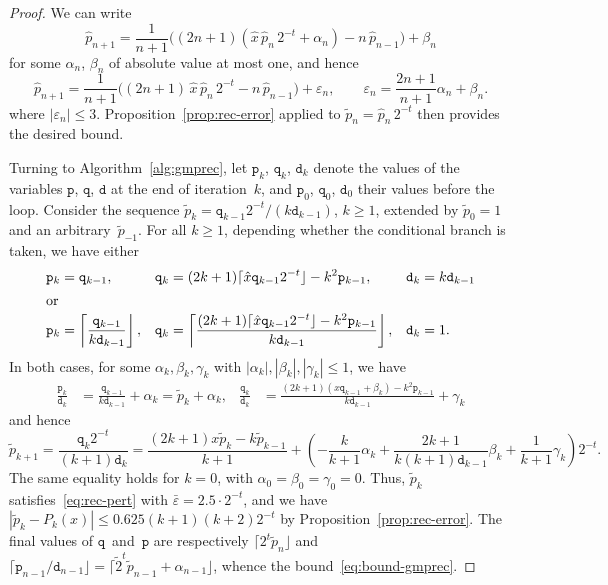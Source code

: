 \documentclass{siamart0216}
\newcommand{\abs}[1]{\mathopen| #1 \mathclose|}
\begin{document}
\begin{proof}
We can write
\[
  \hat{p}_{n + 1} = \frac{1}{n + 1}  \bigl((2 n + 1)  (\hat{x} \,
        \hat{p}_n \, 2^{- t} + \alpha_n) - n \, \hat{p}_{n - 1}\bigr)
        + \beta_n
\]
for some $\alpha_n$, $\beta_n$ of absolute value at most one, and
hence
\[
  \hat{p}_{n + 1} = \frac{1}{n + 1}  \bigl((2 n + 1) \, \hat{x} \,
  \hat{p}_n \, 2^{- t} - n \, \hat{p}_{n - 1}\bigr) + \varepsilon_n,
  \qquad
  \varepsilon_n = \frac{2 n + 1}{n + 1} \alpha_n + \beta_n.
\]
where $\abs{\varepsilon_n} \leq 3$.
Proposition \ref{prop:rec-error} applied to
$\tilde p_n = \hat p_n \, 2^{-t}$
then provides the desired bound.

\newcommand{\vp}{\mathtt p}
\newcommand{\vq}{\mathtt q}
\newcommand{\vd}{\mathtt d}

Turning to Algorithm~\ref{alg:gmprec},
let $\vp_k$, $\vq_k$, $\vd_k$ denote the values of the variables
$\vp$, $\vq$, $\vd$ at the end of iteration~$k$,
and $\vp_0$, $\vq_0$, $\vd_0$ their values before the loop.
Consider the sequence
$\tilde p_k = \vq_{k-1} 2^{-t}/(k \vd_{k-1})$, $k \geq 1$,
extended by $\tilde p_0 = 1$ and an arbitrary~$\tilde p_{-1}$.
For all $k \geq 1$,
depending whether the conditional branch is taken, we have either
\begin{align*}
  \vp_k &= \vq_{k-1}, &
  \vq_k &= (2k+1) \lceil \hat x \vq_{k-1} 2^{-t} \rfloor
          - k^2 \vp_{k-1}, &
  \vd_k &= k \vd_{k-1} \\
\intertext{or}
  \vp_k &= \left\lceil \frac{\vq_{k-1}}{k \vd_{k-1}} \right\rfloor, &
  \vq_k &= \left\lceil \frac{
          (2k+1) \lceil \hat x \vq_{k-1} 2^{-t} \rfloor - k^2 \vp_{k-1}}
          {k \vd_{k-1}} \right\rfloor, &
  \vd_k &= 1.
\end{align*}
In both cases, for some $\alpha_k, \beta_k, \gamma_k$ with
$|\alpha_k|, |\beta_k|, |\gamma_k| \leq 1$, we have
\begin{align*}
  \frac{\vp_k}{\vd_k}
  &= \frac{\vq_{k-1}}{k \vd_{k-1}} + \alpha_k
   = \tilde p_k + \alpha_k, &
  \frac{\vq_k}{\vd_k}
  &= \frac{ (2k+1) (x \vq_{k-1} + \beta_k) - k^2 \vp_{k-1} }
          { k \vd_{k-1} }
     + \gamma_k
\end{align*}
and hence
\[
  \tilde p_{k+1}
  = \frac{\vq_k 2^{-t}}{(k+1) \vd_k}
  = \frac{ (2k+1) x \tilde p_k - k \tilde p_{k-1} }{k+1}
     + \left(
        - \frac{k}{k+1} \alpha_k
        + \frac{2k + 1}{k (k+1) \vd_{k-1}} \beta_k
        + \frac{1}{k+1} \gamma_k
       \right) 2^{-t}.
\]
The same equality holds for $k=0$, with
$\alpha_0 = \beta_0 = \gamma_0 = 0$.
Thus, $\tilde p_k$ satisfies~\eqref{eq:rec-pert} with
$\bar\varepsilon = 2.5 \cdot 2^{-t}$, and we have
$|\tilde p_k - P_k(x)| \leq 0.625 (k+1)(k+2) 2^{-t}$
by Proposition \ref{prop:rec-error}.
The final values of $\vq$~and~$\vp$ are respectively
$\lceil 2^t \tilde p_n \rfloor$
and
$\lceil \vp_{n-1}/\vd_{n-1} \rfloor
= \lceil \tilde 2^t \tilde p_{n-1} + \alpha_{n-1} \rfloor$,
whence the bound~\eqref{eq:bound-gmprec}.
\end{proof}
\end{document}
